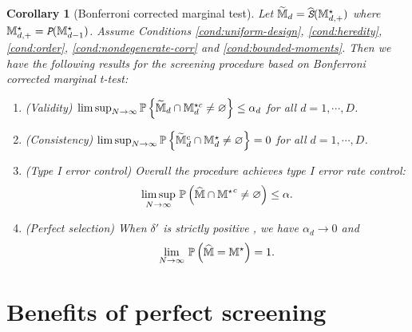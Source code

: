 \documentclass[12pt]{article}
\newtheorem{corollary}{Corollary}
\begin{document}
\begin{corollary}[Bonferroni corrected marginal test]\label{cor:marginal-t}
Let $\widetilde{{\mathbb{M}}}_{d} = \widehat{\texttt{\em S}}({\mathbb{M}}^{\star}_{d,+})$ where ${\mathbb{M}}^{\star}_{d,+} = \texttt{\em P}({\mathbb{M}}^{\star}_{d-1})$. Assume Conditions \ref{cond:uniform-design}, \ref{cond:heredity}, \ref{cond:order}, \ref{cond:nondegenerate-corr} and \ref{cond:bounded-moments}. Then we have
the following results for the  screening procedure based on Bonferroni corrected marginal t-test:
\begin{enumerate}
    \item (Validity) $\lim\sup_{N\to\infty}{\mathbb{P}}\left\{\widetilde{{\mathbb{M}}}_{d}\cap{\mathbb{M}}^{\star c}_d\neq \varnothing\right\}\le \alpha_d$ for all $d=1,\cdots,D$.
    \item (Consistency) $\lim\sup_{N\to\infty}{\mathbb{P}}\left\{\widetilde{{\mathbb{M}}}_{d}^c\cap{\mathbb{M}}^{\star}_d\neq \varnothing\right\} = 0$ for all $d=1,\cdots,D$.
    \item (Type I error control) Overall the procedure achieves type I error rate control:
    \begin{align*}
    \underset{N\to\infty}{\lim\sup}~{\mathbb{P}}\left(\widehat{{\mathbb{M}}}\cap{{\mathbb{M}}^\star}^c\neq \varnothing\right)
    \le \alpha.
    \end{align*}
    \item (Perfect selection) When $\delta' $ is strictly positive , we have $\alpha_d\to0$ and
    \begin{align*}
    \underset{N\to\infty}{\lim}~{\mathbb{P}}\left(\widehat{{\mathbb{M}}} = {{\mathbb{M}}^\star}  \right)
     = 1.
    \end{align*}
\end{enumerate}

\end{corollary}



\section{Benefits of perfect screening}
\end{document}
